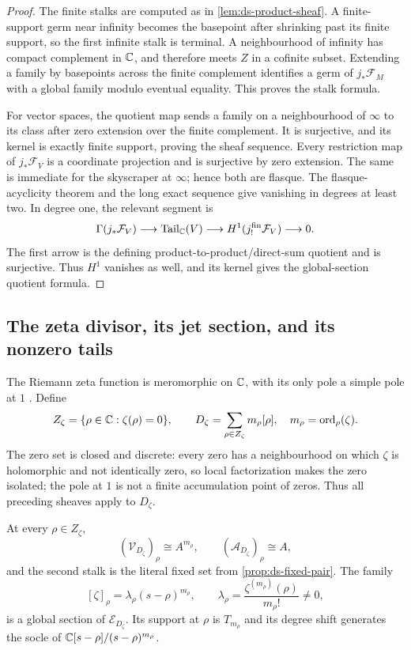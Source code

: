 \begin{proof}
The finite stalks are computed as in \cref{lem:ds-product-sheaf}.  A finite-support
germ near infinity becomes the basepoint after shrinking past its finite support,
so the first infinite stalk is terminal.  A neighbourhood of infinity has compact
complement in $\mathbb C$, and therefore meets $Z$ in a cofinite subset.  Extending a
family by basepoints across the finite complement identifies a germ of
$j_*\mathcal F_M$ with a global family modulo eventual equality.  This proves the
stalk formula.

For vector spaces, the quotient map sends a family on a neighbourhood of
$\infty$ to its class after zero extension over the finite complement.  It is
surjective, and its kernel is exactly finite support, proving the sheaf sequence.
Every restriction map of $j_*\mathcal F_V$ is a coordinate projection and is
surjective by zero extension.  The same is immediate for the skyscraper at
$\infty$; hence both are flasque.  The flasque-acyclicity theorem
\cite[pp.~184--188, Thm.~6.34]{lee2024} and the long exact sequence give
vanishing in degrees at least two.  In degree one, the relevant segment is
\[
 \Gamma(j_*\mathcal F_V)\longrightarrow
 \operatorname{Tail}_{\mathbb C}(V)\longrightarrow
 H^1(j^{\mathrm{fin}}_!\mathcal F_V)\longrightarrow0.
\]
The first arrow is the defining product-to-product/direct-sum quotient and is
surjective.  Thus $H^1$ vanishes as well, and its kernel gives the global-section
quotient formula.
\end{proof}

\subsection{The zeta divisor, its jet section, and its nonzero tails}

The Riemann zeta function is meromorphic on $\mathbb C$, with its only pole a simple
pole at $1$ \cite[\S25.2(i)]{apostolDLMF25}.  Define
\[
 Z_\zeta=\{\rho\in\mathbb C:\zeta(\rho)=0\},
 \qquad
 D_\zeta=\sum_{\rho\in Z_\zeta}m_\rho[\rho],
 \quad m_\rho=\operatorname{ord}_\rho(\zeta).
\]
The zero set is closed and discrete: every zero has a neighbourhood on which
$\zeta$ is holomorphic and not identically zero, so local factorization makes the
zero isolated; the pole at $1$ is not a finite accumulation point of zeros.  Thus
all preceding sheaves apply to $D_\zeta$.

\begin{theorem}
\label{thm:ds-zeta-shadow-jet}
At every $\rho\in Z_\zeta$,
\[
 (\mathcal V_{D_\zeta})_\rho\cong A^{m_\rho},
 \qquad
 (\mathcal A_{D_\zeta})_\rho\cong A,
\]
and the second stalk is the literal fixed set from
\cref{prop:ds-fixed-pair}.  The family
\[
 [\zeta]_\rho
 =\lambda_\rho(s-\rho)^{m_\rho},
 \qquad
 \lambda_\rho=\frac{\zeta^{(m_\rho)}(\rho)}{m_\rho!}\ne0,
\]
is a global section of $\mathcal E_{D_\zeta}$.  Its support at $\rho$ is
$T_{m_\rho}$ and its degree shift generates the socle of
$\mathbb C[s-\rho]/(s-\rho)^{m_\rho}$.
\end{theorem}

